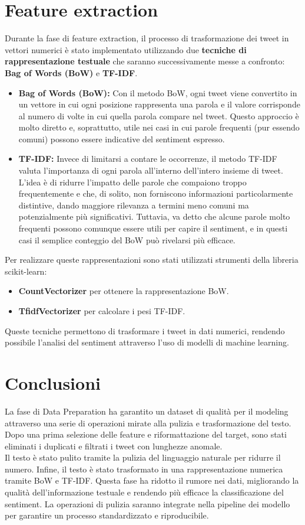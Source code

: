 \documentclass[12pt,a4paper]{report} %
\begin{document}
\section{Feature extraction}
Durante la fase di feature extraction, il processo di trasformazione dei tweet in vettori numerici è stato implementato utilizzando due \textbf{tecniche di rappresentazione testuale} che saranno successivamente messe a confronto: \textbf{Bag of Words (BoW)} e \textbf{TF-IDF}.
\begin{itemize}
    \item \textbf{Bag of Words (BoW):} Con il metodo BoW, ogni tweet viene convertito in un vettore in cui ogni posizione rappresenta una parola e il valore corrisponde al numero di volte in cui quella parola compare nel tweet. Questo approccio è molto diretto e, soprattutto, utile nei casi in cui parole frequenti  (pur essendo comuni) possono essere indicative del sentiment espresso. 
    \item \textbf{TF-IDF:} Invece di limitarsi a contare le occorrenze, il metodo TF-IDF valuta l'importanza di ogni parola all'interno dell'intero insieme di tweet. L'idea è di ridurre l'impatto delle parole che compaiono troppo frequentemente e che, di solito, non forniscono informazioni particolarmente distintive, dando maggiore rilevanza a termini meno comuni ma potenzialmente più significativi. Tuttavia, va detto che alcune parole molto frequenti possono comunque essere utili per capire il sentiment, e in questi casi il semplice conteggio del BoW può rivelarsi più efficace. 
\end{itemize}
 Per realizzare queste rappresentazioni sono stati utilizzati strumenti della libreria scikit-learn:
\begin{itemize}
    \item \textbf{CountVectorizer} per ottenere la rappresentazione BoW.
    \item \textbf{TfidfVectorizer} per calcolare i pesi TF-IDF.
\end{itemize}
Queste tecniche permettono di trasformare i tweet in dati numerici, rendendo possibile l'analisi del sentiment attraverso l'uso di modelli di machine learning. 
\section{\textbf{Conclusioni}}
 La fase di Data Preparation ha garantito un dataset di qualità per il modeling attraverso una serie di operazioni mirate alla pulizia e trasformazione del testo. Dopo una prima selezione delle feature e riformattazione del target, sono stati eliminati i duplicati e filtrati i tweet con lunghezze anomale. \\Il testo è stato pulito tramite la pulizia del linguaggio naturale per ridurre il numero. Infine, il testo è stato trasformato in una rappresentazione numerica tramite BoW e TF-IDF. Questa fase ha ridotto il rumore nei dati, migliorando la qualità dell’informazione testuale e rendendo più efficace la classificazione del sentiment. La operazioni di pulizia saranno integrate nella pipeline dei modello per garantire un processo standardizzato e riproducibile.
\end{document}
